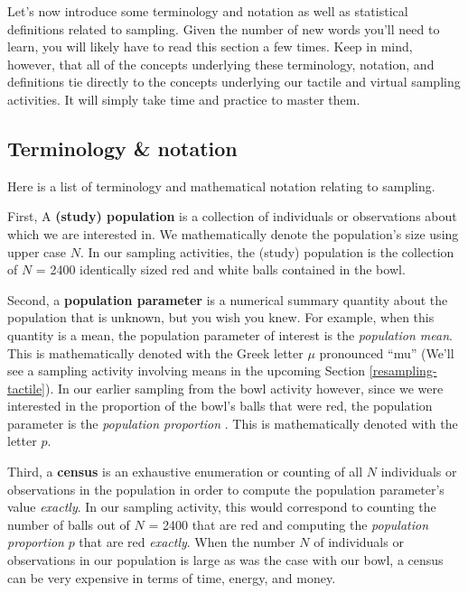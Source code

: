 \documentclass[
]{book}
\begin{document}
Let's now introduce some terminology and notation as well as statistical definitions related to sampling. Given the number of new words you'll need to learn, you will likely have to read this section a few times. Keep in mind, however, that all of the concepts underlying these terminology, notation, and definitions tie directly to the concepts underlying our tactile and virtual sampling activities. It will simply take time and practice to master them.

\hypertarget{terminology-and-notation}{%
\subsection{Terminology \& notation}\label{terminology-and-notation}}

Here is a list of terminology and mathematical notation relating to sampling.

First, A \textbf{(study) population} is a collection of individuals or observations about which we are interested in. We mathematically denote the population's size using upper case \(N\). In our sampling activities, the (study) population is the collection of \(N\) = 2400 identically sized red and white balls contained in the bowl.

Second, a \textbf{population parameter} is a numerical summary quantity about the population that is unknown, but you wish you knew. For example, when this quantity is a mean, the population parameter of interest is the \emph{population mean}. This is mathematically denoted with the Greek letter \(\mu\) pronounced ``mu'' (We'll see a sampling activity involving means in the upcoming Section \ref{resampling-tactile}). In our earlier sampling from the bowl activity however, since we were interested in the proportion of the bowl's balls that were red, the population parameter is the \emph{population proportion} . This is mathematically denoted with the letter \(p\).

Third, a \textbf{census} is an exhaustive enumeration or counting of all \(N\) individuals or observations in the population in order to compute the population parameter's value \emph{exactly}. In our sampling activity, this would correspond to counting the number of balls out of \(N\) = 2400 that are red and computing the \emph{population proportion} \(p\) that are red \emph{exactly}. When the number \(N\) of individuals or observations in our population is large as was the case with our bowl, a census can be very expensive in terms of time, energy, and money.
\end{document}
